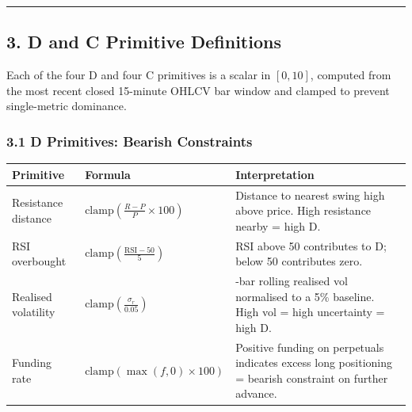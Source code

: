 \documentclass[
  11pt,
  letterpaper,
]{article}
\begin{document}
\begin{center}\rule{0.5\linewidth}{0.5pt}\end{center}

\subsection{3. D and C Primitive
Definitions}\label{d-and-c-primitive-definitions}

Each of the four D and four C primitives is a scalar in \([0, 10]\),
computed from the most recent closed 15-minute OHLCV bar window and
clamped to prevent single-metric dominance.

\subsubsection{3.1 D Primitives: Bearish
Constraints}\label{d-primitives-bearish-constraints}

\begin{longtable}[]{@{}
  >{\raggedright\arraybackslash}p{}
  >{\raggedright\arraybackslash}p{}
  >{\raggedright\arraybackslash}p{}@{}}
\toprule\noalign{}
\begin{minipage}[b]{\linewidth}\raggedright
Primitive
\end{minipage} & \begin{minipage}[b]{\linewidth}\raggedright
Formula
\end{minipage} & \begin{minipage}[b]{\linewidth}\raggedright
Interpretation
\end{minipage} \\
\midrule\noalign{}
\endhead
\bottomrule\noalign{}
\endlastfoot
Resistance distance &
\(\text{clamp}\!\left(\frac{R - P}{P} \times 100\right)\) & Distance to
nearest swing high above price. High resistance nearby = high D. \\
RSI overbought &
\(\text{clamp}\!\left(\frac{\text{RSI} - 50}{5}\right)\) & RSI above 50
contributes to D; below 50 contributes zero. \\
Realised volatility &
\(\text{clamp}\!\left(\frac{\sigma_r}{0.05}\right)\) & 30-bar rolling
realised vol normalised to a 5\% baseline. High vol = high uncertainty =
high D. \\
Funding rate & \(\text{clamp}\!\left(\max(f, 0) \times 100\right)\) &
Positive funding on perpetuals indicates excess long positioning =
bearish constraint on further advance. \\
\end{longtable}
\end{document}
